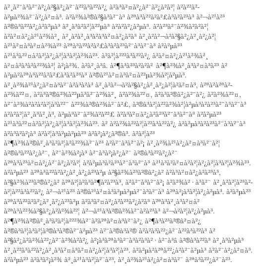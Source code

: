 à²¸à²¨à³à²¨à²¿à²§à²¿à²¯à²²à³à²²à²¿ à²à³à²¤à²¿à²¯à²¿à²à²¦ à²à²²à²­à²µà²¾à²¯à²¿à²¤à³. à²à²¾à²®à²§à³à²¨à³ à²ªà³à²²à²à²£à³à²à²³à³ à²¬à²¹à²³ à²®à³à²²à²¿à²à²µà³ à²¸à³à²à²¦à²²µà³ à²à²à²¿à²µà³. à²à²³à²¨à²¾à²à²à²¦ à²à²¤à²¿à²¹à²¾à²¸ à²¸à²à²¸à³à²à³à²¤à²¿à²à³ à²¸à²à²¬à²à²§à²¿à²¸à²¿à²¦ à²¹à²¤à³à²¤à²¾à²³ à²ªà³à²²à²à²£à³à²à²³à²¨à³à²¨à³ à²à²µà²³ à²¹à³à²²¤à²à²¦à²¿à²¦à³à²¦à²¾à²³. à²à²¦à²²²à³à²²à²¿ à²à²¤à²¿à²¹à²¾à²¸ à²¤à²à³à²à²²¾à²¦ à²¡à²¾. à²à²¸à³â. à²¶à³à²³à²à²à² à²¶à²¾à²¸à³à²¤à³à²³ à²à²µà²\circ à²ªà³à²²à²à²£à³à²à²³à³ à²®à²¹à²¤à³à²¤à²²µà²¾à²¦à²µà³. à²¸à²¾à²¹à²¿à²¤à³à²¯à²à³à²à³ à²¸à²à²¬à²à²§à²¿à²¸à²¿à²¦à²à²¤à³, à²ªà²à²ªà²­à²¾à²²¤, à²à³à²®à²¾à²²µà³à²¯à²¾à²¸ à²­à²¾à²²¤, à²à³à²®à²¿à²¨à²¿ à²­à²¾à²²¤, à²¨à²¾à²à²à²à²¦à³à²²¨ à²²¾à²®à²¾à²¯à²£, à²®à³à²¦à²²à²¾à²¦à²µà³à²à²³à²¨à³à²¨à³ à²à²à²¦à²¸à³à²¸à³, à²µà³à²¯à²¾à²à²²£ à²à³à²¤à²¿à²à²³à²¨à³à²¨à³ à²à²µà²³ à²¹à³à²²¤à²à²¦à²¿à²¦à³à²¦à²¾à²³. à² à²à²¾à²²à²¦à²²à³à²²à²¿ à²à²µà³à²à²³à²¨à³à²¨à³ à²à³à²à²¡à³ à²à²¦à³à²µà²µà²³ à²à²¡à²¿à²®à³. à²à²¦à²³ à²¶à²¾à²®à²¸à³à²à²¦à²\circ à²²¾à²¯à²³ à²à²¨à³à²¨à²¡ à²¸à²¾à²¹à²¿à²¤à³à²¯à²¦ à²®à³à²²à²¿à²¨, à²¨à²¾à²¡à³ à²¨à³à²¡à²¿à²¯ à²®à³à²²à²¿à²¨ à²ªà³à²³à²¤à²¿à²¯à²¿à²à²¦ à²à²µà³à²à²³à²¨à³à²¨à³ à²¹à³à²\circ à²¤à²à²¦à²¿à²¦à³à²¦à²¾à²³. à²à²µà²³ à²ªà³à²²à²à²¿à²¸à²¿à²³à²µ à²§à²¾à²³à²®à²¿à² à²à³à²¤à²¿à²à²³à³, à²§à²¾à²³à²®à²¿à² à²ªà²¦à²à³à²¶à²à²³à³, à²à²¨à³à²¨à²¡ à²­à²¾à²·à³à²¯ à²¸à²à²¦à²³à²­à²¦à²²à³à²²à²¿ à²¬à²¹à²³ à²®à²¹à²¤à³à²µà²µà²¨à³à²¨à³ à²ªà²¡à³à²¦à²¿à²µà³. à²à²µà²³ à²ªà³à²²à²à²¿à²¸à²¿à²³à²µ à²à³à²¤à²¿à²à²³à²¿à²à³ à²ªà³à²¸à³à²¤à² à²ªà³à²²¾à²§à²¿à²à²¾à²²¦ à²¬à²¹à³à²®à²¾à²¨à²à²³à³ à²¬à²à²¦à²¿à²µà³. à²¶à²¾à²®à²¸à³à²à²¦à²²²¾à²¯à²\circ à²ªà²¤à³à²¨à²¿ à²¶à³à²³à²®à²¤à²¿ à²®à³à²¦à³à²¦à²®à³à²®à²¨à²µà²³ à²¨à²®à³à²® à²à²à³à²²¿à²¯à²²à³à²²à³ à²à²§à²¿à²à²¾à²²¿à²¯à²¾à²à²¿ à²¡à³à²ªà³à²¯à³à²à³à²·à²¨à³â à²®à³à²²à³ à²¸à³à²µà³ à²¸à²²à³à²²à²¿à²¸à³à²¤à³à²¤à²¿à²¦à³à²¦à²³. à²à²µà²\circ à²ªà²²¿à²à²¯à²µà³ à²à²¯à²¿à²¤à³. à²à²µà²³ à²à³à²¡à²¾ à²¸à²¹à³à²¦à²¯à²³, à²¸à²¾à²¹à²¿à²¤à³à²¯ à²ªà³à²²¿à²¯à²³. 

